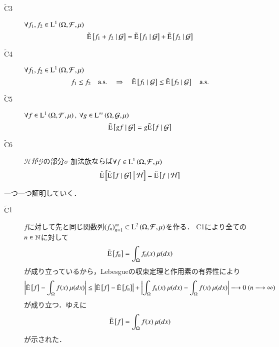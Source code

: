 \begin{prf}
\begin{description}
			\item[$\tilde{\mathrm{C}}$3]	$\forall f_1,f_2 \in \operatorname{L}^{1} \left(\Omega, \mathcal{F},\mu\right)$
				\begin{align}
					\tilde{\operatorname{E}} \left[ f_1 + f_2 \ \middle|\ \mathcal{G} \right] = \tilde{\operatorname{E}} \left[ f_1 \ \middle|\ \mathcal{G} \right] + \tilde{\operatorname{E}} \left[ f_2 \ \middle|\ \mathcal{G} \right]
				\end{align}

			\item[$\tilde{\mathrm{C}}$4]	$\forall f_1,f_2 \in \operatorname{L}^{1} \left(\Omega, \mathcal{F},\mu\right)$
				\begin{align}
					f_1 \leq f_2 \quad \mathrm{a.s.} \quad \Rightarrow \quad \tilde{\operatorname{E}} \left[ f_1 \ \middle|\ \mathcal{G} \right] \leq \tilde{\operatorname{E}} \left[ f_2 \ \middle|\ \mathcal{G} \right] \quad \mathrm{a.s.}
				\end{align}
			
			\item[$\tilde{\mathrm{C}}$5]	$\forall f \in \operatorname{L}^{1} \left(\Omega, \mathcal{F},\mu\right),\ \forall g \in \operatorname{L}^{\infty} \left(\Omega, \mathcal{G},\mu\right)$
				\begin{align}
					\tilde{\operatorname{E}} \left[ gf \ \middle|\ \mathcal{G} \right] = g\tilde{\operatorname{E}} \left[ f \ \middle|\ \mathcal{G} \right]
				\end{align}
			
			\item[$\tilde{\mathrm{C}}$6]	$\mathcal{H}$が$\mathcal{G}$の部分$\sigma$-加法族ならば$\forall f \in \operatorname{L}^{1} \left(\Omega, \mathcal{F},\mu\right)$
				\begin{align}
					\tilde{\operatorname{E}} \left[ \tilde{\operatorname{E}} \left[ f \ \middle|\ \mathcal{G} \right] \ \middle|\ \mathcal{H} \right] = \tilde{\operatorname{E}} \left[ f \ \middle|\ \mathcal{H} \right]
				\end{align}
		\end{description}
		一つ一つ証明していく．
		\begin{description}
			\item[$\tilde{\mathrm{C}}$1]
				$f$に対して先と同じ関数列$(f_n)_{n=1}^{\infty} \subset \operatorname{L}^{2} \left(\Omega,\mathcal{F},\mu\right)$を作る．
				C1により全ての$n \in \mathbb{N}$に対して
				\begin{align}
					\tilde{\operatorname{E}} \left[ f_n \right] = \int_{\Omega} f_n(x)\ \mu(dx)
				\end{align}
				が成り立っているから，Lebesgueの収束定理と作用素の有界性により
				\begin{align}
					\left| \tilde{\operatorname{E}} \left[ f \right] - \int_{\Omega} f(x)\ \mu(dx) \right|
					\leq \left| \tilde{\operatorname{E}} \left[ f \right] - \tilde{\operatorname{E}} \left[ f_n \right] \right| + \left| \int_{\Omega} f_n(x)\ \mu(dx) - \int_{\Omega} f(x)\ \mu(dx) \right|
					\longrightarrow 0\ (n \longrightarrow \infty)
				\end{align}
				が成り立つ．ゆえに
				\begin{align}
					\tilde{\operatorname{E}} \left[ f \right] = \int_{\Omega} f(x)\ \mu(dx)
				\end{align}
				が示された．
				

\end{description}
\end{prf}
